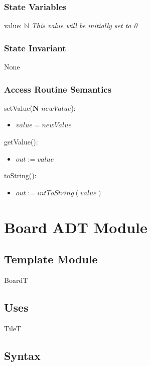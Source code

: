 \documentclass[12pt]{article}
\begin{document}
\subsubsection* {State Variables}

value: $\mathbb{N}$
\noindent \textit{This value will be initially set to 0}

\subsubsection* {State Invariant}

None

\subsubsection* {Access Routine Semantics}

setValue($\textbf{N}$ $newValue$):
\begin{itemize}
  \item $value= newValue$
\end{itemize}

\noindent getValue():
\begin{itemize}
  \item $out := value$
\end{itemize}

\noindent toString():
\begin{itemize}
  \item $out := intToString(value)$
\end{itemize}

\newpage

\section* {Board ADT Module}

\subsection*{Template Module}

BoardT

\subsection* {Uses}

TileT

\subsection* {Syntax}
\end{document}
